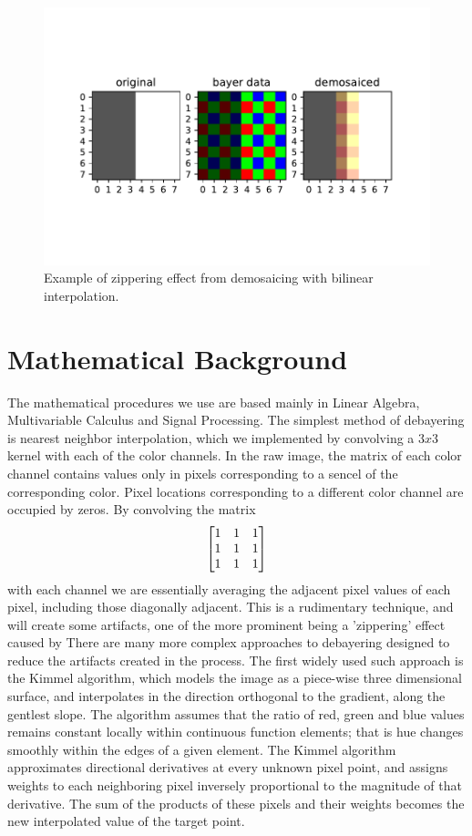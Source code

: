\documentclass{article}\twocolumn
\begin{document}
\begin{figure}[!h]
    \centering
    \includegraphics[width=\columnwidth]{edge_zippering.pdf}
    \caption{Example of zippering effect from demosaicing with bilinear interpolation.}
    \label{fig:edge_zippering}
\end{figure}

\section{Mathematical Background}
The mathematical procedures we use are based mainly in Linear Algebra, Multivariable Calculus and Signal Processing. The simplest method of debayering is nearest neighbor interpolation, which we implemented by convolving a  $3x3$ kernel with each of the color channels. In the raw image, the matrix of each color channel contains values only in pixels corresponding to a sencel of the corresponding color. Pixel locations corresponding to a different color channel are occupied by zeros. By convolving the matrix 
    \begin{align}
        \begin{bmatrix} 1 & 1 & 1 \\ 1 & 1 & 1 \\ 1 & 1 & 1 \end{bmatrix}
    \end{align}
with each channel we are essentially averaging the adjacent pixel values of each pixel, including those diagonally adjacent. This is a rudimentary technique, and will create some artifacts, one of the more prominent being a 'zippering' effect caused by %
There are many more complex approaches to debayering designed to reduce the artifacts created in the process. The first widely used such approach is the Kimmel algorithm\cite{kimmel_demosaicing:_1999}, which models the image as a piece-wise three dimensional surface, and interpolates in the direction orthogonal to the gradient, along the gentlest slope. The algorithm assumes that the ratio of red, green and blue values remains constant locally within continuous function elements; that is hue changes smoothly within the edges of a given element. The Kimmel algorithm approximates directional derivatives at every unknown pixel point, and assigns weights to each neighboring pixel inversely proportional to the magnitude of that derivative. The sum of the products of these pixels and their weights becomes the new interpolated value of the target point. 
\end{document}
